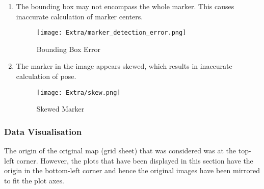 \documentclass[10pt,a4paper]{article}
\begin{document}
\begin{enumerate}
\begin{enumerate}
		\item
		The bounding box may not encompass the whole marker. This causes inaccurate calculation of marker centers.
		
		\vspace{0.5cm}
		
		\begin{figure}[H]
			\centering
			\texttt{[image: Extra/marker\_detection\_error.png]}
			\caption{Bounding Box Error}
		\end{figure}
		
		\item
		The marker in the image appears skewed, which results in inaccurate calculation of pose.
		
		\begin{figure}[H]
			\centering
			\texttt{[image: Extra/skew.png]}
			\caption{Skewed Marker}
		\end{figure}
		
		
	\end{enumerate}
	
	
\end{enumerate}


\newpage
\subsubsection{Data Visualisation}

The origin of the original map (grid sheet) that was considered was at the top-left corner. However, the plots that have been displayed in this section have the origin in the bottom-left corner and hence the original images have been mirrored to fit the plot axes.
\end{document}
